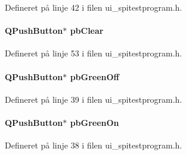 Defineret på linje 42 i filen ui\+\_\+spitestprogram.\+h.

\paragraph[{\texorpdfstring{pb\+Clear}{pbClear}}]{\setlength{\rightskip}{0pt plus 5cm}Q\+Push\+Button$\ast$ pb\+Clear\hspace{0.3cm}{\ttfamily [inherited]}}\hypertarget{class_ui___spi_test_program_a9fa60ac8492007635b4648a0c6c88201}{}\label{class_ui___spi_test_program_a9fa60ac8492007635b4648a0c6c88201}


Defineret på linje 53 i filen ui\+\_\+spitestprogram.\+h.

\paragraph[{\texorpdfstring{pb\+Green\+Off}{pbGreenOff}}]{\setlength{\rightskip}{0pt plus 5cm}Q\+Push\+Button$\ast$ pb\+Green\+Off\hspace{0.3cm}{\ttfamily [inherited]}}\hypertarget{class_ui___spi_test_program_ad4aa6f2ff845832ee96f6158c85bbfba}{}\label{class_ui___spi_test_program_ad4aa6f2ff845832ee96f6158c85bbfba}


Defineret på linje 39 i filen ui\+\_\+spitestprogram.\+h.

\paragraph[{\texorpdfstring{pb\+Green\+On}{pbGreenOn}}]{\setlength{\rightskip}{0pt plus 5cm}Q\+Push\+Button$\ast$ pb\+Green\+On\hspace{0.3cm}{\ttfamily [inherited]}}\hypertarget{class_ui___spi_test_program_aa00d405e11fadc9dd8d0b7aae2632903}{}\label{class_ui___spi_test_program_aa00d405e11fadc9dd8d0b7aae2632903}


Defineret på linje 38 i filen ui\+\_\+spitestprogram.\+h.

